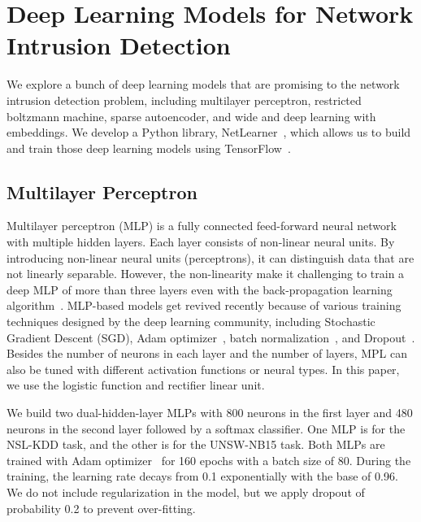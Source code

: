 \section{Deep Learning Models for Network Intrusion Detection}
\label{Sec:Architectures}

We explore a bunch of deep learning models that are promising to the
network intrusion detection problem, including multilayer perceptron, restricted boltzmann machine, sparse autoencoder, and wide and deep learning with embeddings. We develop a Python library, NetLearner~\cite{NetLearner}, which allows us to build and train those deep learning models using TensorFlow~\cite{TensorFlow}.

\subsection{Multilayer Perceptron}
\label{SubSec:MLP}
Multilayer perceptron (MLP) is a fully connected feed-forward neural network with multiple hidden layers.
Each layer consists of non-linear neural units.
By introducing non-linear neural units (perceptrons), it can distinguish data that are not linearly separable.
However, the non-linearity make it challenging to train a deep MLP of more than three layers even with the back-propagation learning algorithm~\cite{Backpropagation}.
MLP-based models get revived recently because of various training techniques designed by the deep learning community, including Stochastic Gradient Descent (SGD), Adam optimizer~\cite{Adam},
batch normalization~\cite{BatchNorm}, and Dropout~\cite{Dropout}.
Besides the number of neurons in each layer and the number of layers,
MPL can also be tuned with different activation functions or neural types.
In this paper, we use the logistic function and rectifier linear unit.

We build two dual-hidden-layer MLPs with 800 neurons in the first layer and 480 neurons in the second layer followed by a softmax classifier.
One MLP is for the NSL-KDD task, and the other is for the UNSW-NB15 task.
Both MLPs are trained with Adam optimizer~\cite{Adam} for 160 epochs with a batch size of 80.
During the training, the learning rate decays from 0.1 exponentially with the base of 0.96.
We do not include regularization in the model, but we apply dropout of probability 0.2 to prevent over-fitting.


